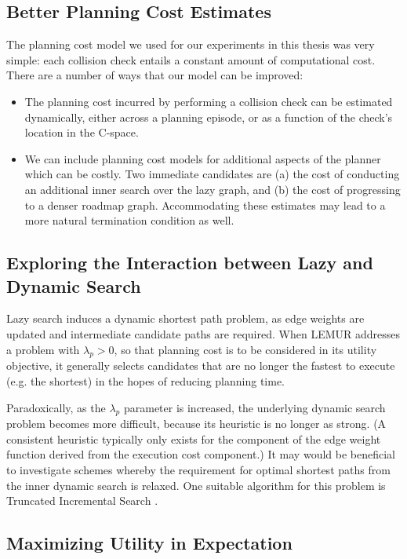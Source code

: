 \subsection{Better Planning Cost Estimates}

The planning cost model we used for our experiments in this thesis
was very simple:
each collision check entails a constant amount of computational cost.
There are a number of ways that our model can be improved:
\begin{itemize}
\item The planning cost incurred by performing a collision check
   can be estimated dynamically,
   either across a planning episode,
   or as a function of the check's location in the C-space.
\item We can include planning cost models for additional aspects of
   the planner which can be costly.
   Two immediate candidates are
   (a) the cost of conducting an additional inner search
   over the lazy graph,
   and (b) the cost of progressing to a denser roadmap graph.
   Accommodating these estimates may lead to a more natural
   termination condition as well.
\end{itemize}

\subsection{Exploring the Interaction between Lazy and Dynamic Search}

Lazy search induces a dynamic shortest path problem,
as edge weights are updated and intermediate candidate paths are
required.
When LEMUR addresses a problem with $\lambda_p > 0$,
so that planning cost is to be considered in its utility objective,
it generally selects candidates that are no longer the fastest
to execute (e.g. the shortest) in the hopes of reducing planning time.

Paradoxically,
as the $\lambda_p$ parameter is increased,
the underlying dynamic search problem becomes more difficult,
because its heuristic is no longer as strong.
(A consistent heuristic typically only exists for the component of
the edge weight function derived from the execution cost component.)
It may would be beneficial to investigate schemes whereby
the requirement for optimal shortest paths from the inner
dynamic search is relaxed.
One suitable algorithm for this problem is Truncated
Incremental Search \citep{aine2016truncatedincremental}.

\subsection{Maximizing Utility in Expectation}

